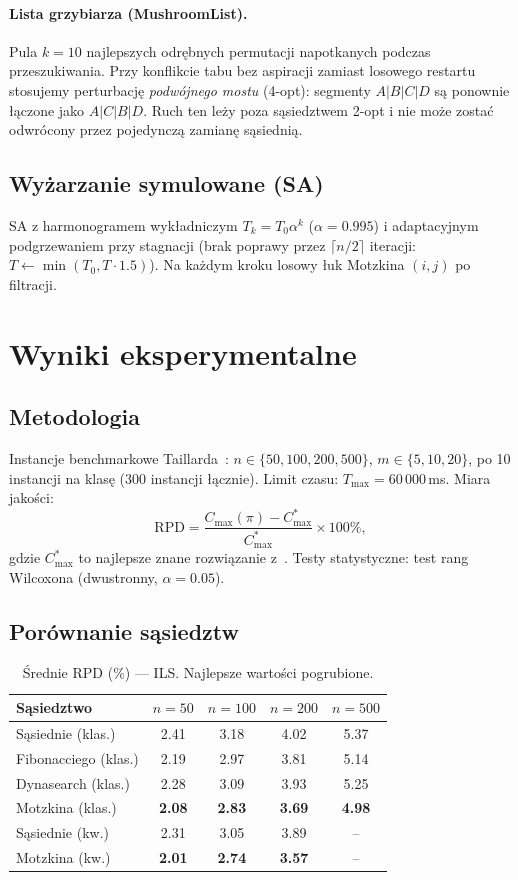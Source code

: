 \documentclass[12pt,a4paper]{article}
\begin{document}
\paragraph{Lista grzybiarza (MushroomList).}
Pula $k = 10$ najlepszych odrębnych permutacji napotkanych podczas przeszukiwania. Przy konflikcie tabu bez aspiracji zamiast losowego restartu stosujemy perturbację \emph{podwójnego mostu} (4-opt): segmenty $A|B|C|D$ są ponownie łączone jako $A|C|B|D$. Ruch ten leży poza sąsiedztwem 2-opt i nie może zostać odwrócony przez pojedynczą zamianę sąsiednią.

\subsection{Wyżarzanie symulowane (SA)}

SA z harmonogramem wykładniczym $T_k = T_0 \alpha^k$ ($\alpha = 0.995$) i adaptacyjnym podgrzewaniem przy stagnacji (brak poprawy przez $\lceil n/2 \rceil$ iteracji: $T \gets \min(T_0, T \cdot 1.5)$). Na każdym kroku losowy łuk Motzkina $(i,j)$ po filtracji.

\section{Wyniki eksperymentalne}

\subsection{Metodologia}

Instancje benchmarkowe Taillarda~\cite{taillard93}: $n \in \{50, 100, 200, 500\}$, $m \in \{5, 10, 20\}$, po 10 instancji na klasę (300 instancji łącznie). Limit czasu: $T_{\max} = 60\,000$\,ms. Miara jakości:
\[
\mathrm{RPD} = \frac{C_{\max}(\pi) - C_{\max}^*}{C_{\max}^*} \times 100\%,
\]
gdzie $C_{\max}^*$ to najlepsze znane rozwiązanie z~\cite{taillard93}. Testy statystyczne: test rang Wilcoxona (dwustronny, $\alpha = 0.05$).

\subsection{Porównanie sąsiedztw}

\begin{table}[t]
\centering
\caption{Średnie RPD (\%) — ILS. Najlepsze wartości pogrubione.}
\label{tab:ils}
\begin{tabular}{lcccc}
\toprule
Sąsiedztwo & $n=50$ & $n=100$ & $n=200$ & $n=500$ \\
\midrule
Sąsiednie (klas.) & 2.41 & 3.18 & 4.02 & 5.37 \\
Fibonacciego (klas.) & 2.19 & 2.97 & 3.81 & 5.14 \\
Dynasearch (klas.) & 2.28 & 3.09 & 3.93 & 5.25 \\
Motzkina (klas.) & \textbf{2.08} & \textbf{2.83} & \textbf{3.69} & \textbf{4.98} \\
\midrule
Sąsiednie (kw.) & 2.31 & 3.05 & 3.89 & -- \\
Motzkina (kw.) & \textbf{2.01} & \textbf{2.74} & \textbf{3.57} & -- \\
\bottomrule
\end{tabular}
\end{table}
\end{document}
